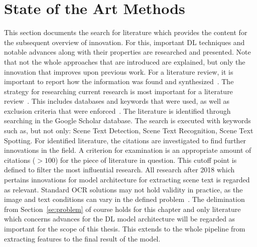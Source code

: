 \section{State of the Art Methods}\label{se:innovations}
This section documents the search for literature which provides the content for the subsequent
overview of innovation.
For this, important \ac{DL} techniques and notable advances along with their properties are researched
and presented.
Note that not the whole approaches that are introduced are explained, but only the innovation that
improves upon previous work.
For a literature review, it is important to report how the information was found and
synthesized~\citep{torraco_writing_2005}.
The strategy for researching current research is most important for a literature
review~\citep{snyder_literature_2019}.
This includes databases and keywords that were used, as well as exclusion criteria that were
enforced~\citep{torraco_writing_2005}.
The literature is identified through searching in the Google Scholar database.
The search is executed with keywords such as, but not only: Scene Text Detection,
Scene Text Recognition, Scene Text Spotting.
For identified literature, the citations are investigated to find further innovations in the field.
A criterion for examination is an appropriate amount of citations ($>100$) for the piece of
literature in question.
This cutoff point is defined to filter the most influential research.
All research after 2018 which pertains innovations for model architecture for extracting scene
text is regarded as relevant.
Standard \ac{OCR} solutions may not hold validity in practice, as the image and text conditions can
vary in the defined problem~\citep{chen_text_2021}.
The delimination from Section~\ref{se:problem} of course holds for this chapter and only literature
which concerns advances for the \ac{DL} model architecture will be regarded as important for the
scope of this thesis.
This extends to the whole pipeline from extracting features to the final result of the model.

